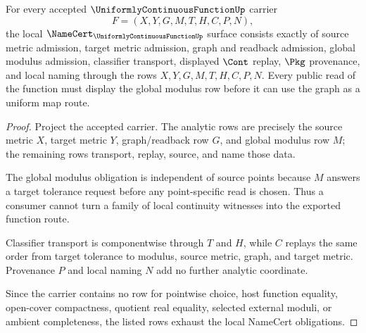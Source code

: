 \begin{theorem}
\label{thm:uniformly-continuous-function-namecert-obligations}
For every accepted $\UniformlyContinuousFunctionUp$ carrier
$$
F=(X,Y,G,M,T,H,C,P,N),
$$
the local $\NameCert_{\UniformlyContinuousFunctionUp}$ surface consists exactly of source metric admission, target metric admission, graph and readback admission, global modulus admission, classifier transport, displayed $\Cont$ replay, $\Pkg$ provenance, and local naming through the rows $X,Y,G,M,T,H,C,P,N$. Every public read of the function must display the global modulus row before it can use the graph as a uniform map route.
\end{theorem}
\begin{proof}
Project the accepted carrier. The analytic rows are precisely the source metric $X$, target metric $Y$, graph/readback row $G$, and global modulus row $M$; the remaining rows transport, replay, source, and name those data.

The global modulus obligation is independent of source points because $M$ answers a target tolerance request before any point-specific read is chosen. Thus a consumer cannot turn a family of local continuity witnesses into the exported function route.

Classifier transport is componentwise through $T$ and $H$, while $C$ replays the same order from target tolerance to modulus, source metric, graph, and target metric. Provenance $P$ and local naming $N$ add no further analytic coordinate.

Since the carrier contains no row for pointwise choice, host function equality, open-cover compactness, quotient real equality, selected external moduli, or ambient completeness, the listed rows exhaust the local NameCert obligations.
\end{proof}

